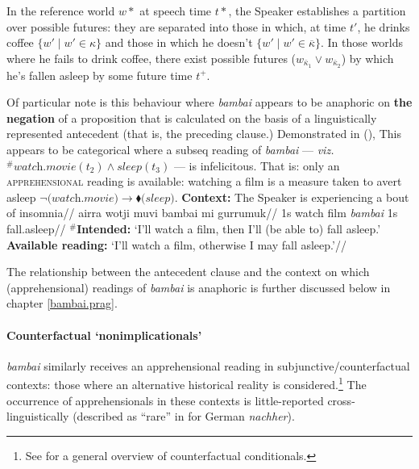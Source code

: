 In the reference world $w*$ at speech time $t*$, the Speaker establishes a partition over possible futures: they are separated into those in which, at time $ t' $, he drinks coffee $ \{w'\mid w'\in\kappa \} $ and those in which he doesn't $ \{w'\mid w'\in\overline\kappa \} $. In those worlds where he fails to drink coffee, there exist possible futures ($w_{\bar\kappa_1}\vee w_{\bar\kappa_2}$) by which he's fallen asleep by some future time $t^+$.
\xe

Of particular note is this behaviour where \textit{bambai} appears to be anaphoric on \textbf{the negation} of a proposition that is calculated on the basis of a linguistically represented antecedent (that is, the preceding clause.) Demonstrated in (), This appears to be categorical where a {\sc subseq} reading of \textit{bambai} --- \textit{viz.} $^\# \textit{watch.movie}(t_2) \wedge \textit{sleep}(t_3) $ --- is infelicitous. That is: only an \textsc{apprehensional} reading is available: watching a film is a measure taken to avert asleep $ \boldsymbol\neg\textit{(watch.movie)}\to\blacklozenge \textit{(sleep)} $.
\pex
\begingl\glpreamble\textbf{Context:} The Speaker is experiencing a bout of insomnia//
\gla\ljudge{$^\#$}airra wotji muvi bambai mi gurrumuk//
\glb 1s watch film \textit{bambai} 1s fall.asleep//
\glft $ ^\# $\textbf{Intended:} `I'll watch a film, then I'll (be able to) fall asleep.'\\
\textbf{Available reading:} `I'll watch a film, otherwise I may fall asleep.'\trailingcitation{[AJ~23022017]}//
\endgl\xe

The relationship between the antecedent clause and the context on which (apprehensional) readings of \textit{bambai} is anaphoric is further discussed below in chapter \ref{bambai.prag}.
\paragraph{Counterfactual `nonimplicationals'}

\textit{bambai} similarly receives an apprehensional reading in subjunctive/counterfactual contexts: those where an alternative historical reality is considered.\footnote{See \citealp{VonFintel2012} for a general overview of counterfactual conditionals.} The occurrence of apprehensionals in these contexts is little-reported cross-linguistically (described as ``rare'' in \citealp{Angelo2018} for German \textit{nachher}).



